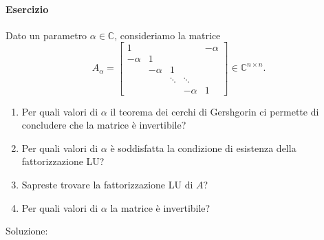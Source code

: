 \documentclass[a4paper]{report}
\theoremstyle{definiton}
\theoremstyle{remark}
\begin{document}
\paragraph{Esercizio} Dato un parametro $\alpha \in \mathbb{C}$, consideriamo la matrice
\[
A_\alpha =
\begin{bmatrix}
    1  & & & & -\alpha\\
    -\alpha & 1 & & & \\
    & -\alpha & 1 & & \\
    & & \ddots & \ddots\\
    & & & -\alpha & 1
\end{bmatrix} \in \mathbb{C}^{n\times n}.
\]
\begin{enumerate}
    \item Per quali valori di $\alpha$ il teorema dei cerchi di Gershgorin ci permette di concludere che la matrice è invertibile?
    \item Per quali valori di $\alpha$ è soddisfatta la condizione di esistenza della fattorizzazione LU?
    \item Sapreste trovare la fattorizzazione LU di $A$?
    \item Per quali valori di $\alpha$ la matrice è invertibile?
\end{enumerate}
Soluzione:
\end{document}
